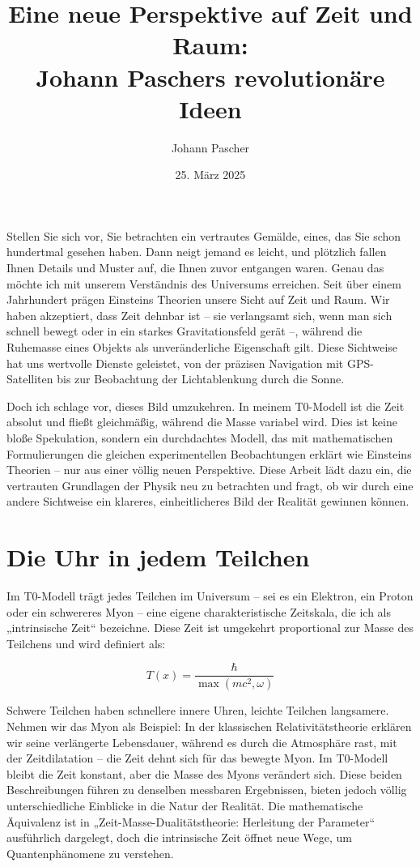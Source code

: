 \documentclass[a4paper,12pt]{article}
\title{Eine neue Perspektive auf Zeit und Raum: \\Johann Paschers revolutionäre Ideen}
\author{Johann Pascher}
\date{25. März 2025}
\newcommand{\Tfield}{T(x)}
\begin{document}
	
	\maketitle
	
	Stellen Sie sich vor, Sie betrachten ein vertrautes Gemälde, eines, das Sie schon hundertmal gesehen haben. Dann neigt jemand es leicht, und plötzlich fallen Ihnen Details und Muster auf, die Ihnen zuvor entgangen waren. Genau das möchte ich mit unserem Verständnis des Universums erreichen. Seit über einem Jahrhundert prägen Einsteins Theorien unsere Sicht auf Zeit und Raum. Wir haben akzeptiert, dass Zeit dehnbar ist – sie verlangsamt sich, wenn man sich schnell bewegt oder in ein starkes Gravitationsfeld gerät –, während die Ruhemasse eines Objekts als unveränderliche Eigenschaft gilt. Diese Sichtweise hat uns wertvolle Dienste geleistet, von der präzisen Navigation mit GPS-Satelliten bis zur Beobachtung der Lichtablenkung durch die Sonne.
	
	Doch ich schlage vor, dieses Bild umzukehren. In meinem T0-Modell ist die Zeit absolut und fließt gleichmäßig, während die Masse variabel wird. Dies ist keine bloße Spekulation, sondern ein durchdachtes Modell, das mit mathematischen Formulierungen die gleichen experimentellen Beobachtungen erklärt wie Einsteins Theorien – nur aus einer völlig neuen Perspektive. Diese Arbeit lädt dazu ein, die vertrauten Grundlagen der Physik neu zu betrachten und fragt, ob wir durch eine andere Sichtweise ein klareres, einheitlicheres Bild der Realität gewinnen können.
	
	\section{Die Uhr in jedem Teilchen}
	
	Im T0-Modell trägt jedes Teilchen im Universum – sei es ein Elektron, ein Proton oder ein schwereres Myon – eine eigene charakteristische Zeitskala, die ich als „intrinsische Zeit“ bezeichne. Diese Zeit ist umgekehrt proportional zur Masse des Teilchens und wird definiert als:
	
	\begin{equation}
		\Tfield = \frac{\hbar}{\max(m c^2, \omega)}
	\end{equation}
	
	Schwere Teilchen haben schnellere innere Uhren, leichte Teilchen langsamere. Nehmen wir das Myon als Beispiel: In der klassischen Relativitätstheorie erklären wir seine verlängerte Lebensdauer, während es durch die Atmosphäre rast, mit der Zeitdilatation – die Zeit dehnt sich für das bewegte Myon. Im T0-Modell bleibt die Zeit konstant, aber die Masse des Myons verändert sich. Diese beiden Beschreibungen führen zu denselben messbaren Ergebnissen, bieten jedoch völlig unterschiedliche Einblicke in die Natur der Realität. Die mathematische Äquivalenz ist in „Zeit-Masse-Dualitätstheorie: Herleitung der Parameter“ \cite{pascher_params_2025} ausführlich dargelegt, doch die intrinsische Zeit öffnet neue Wege, um Quantenphänomene zu verstehen.
	
\end{document}
